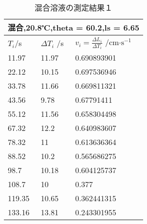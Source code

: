 \documentclass{jsarticle}
\begin{document}
\begin{table}[H]
\centering
\caption{混合溶液の測定結果１}
\label{my-label}
\begin{tabular}{|l|l|l|}
\hline
\multicolumn{3}{|l|}{混合,20.8℃,theta = 60.2,ls = 6.65} \\ \hline
$T_i $/s   & $\Delta T_i $ /s  & $v_i = \frac{\Delta L_i}{\Delta T_i}$ /cm$\cdot \textrm{s}^{-1}$   \\ \hline
11.97           & 11.97         & 0.690893901         \\ \hline
22.12           & 10.15         & 0.697536946         \\ \hline
33.78           & 11.66         & 0.669811321         \\ \hline
43.56           & 9.78          & 0.67791411          \\ \hline
55.12           & 11.56         & 0.658304498         \\ \hline
67.32           & 12.2          & 0.640983607         \\ \hline
78.32           & 11            & 0.613636364         \\ \hline
88.52           & 10.2          & 0.565686275         \\ \hline
98.7            & 10.18         & 0.604125737         \\ \hline
108.7           & 10            & 0.377               \\ \hline
119.35          & 10.65         & 0.362441315         \\ \hline
133.16          & 13.81         & 0.243301955         \\ \hline
\end{tabular}
\end{table}
\end{document}
